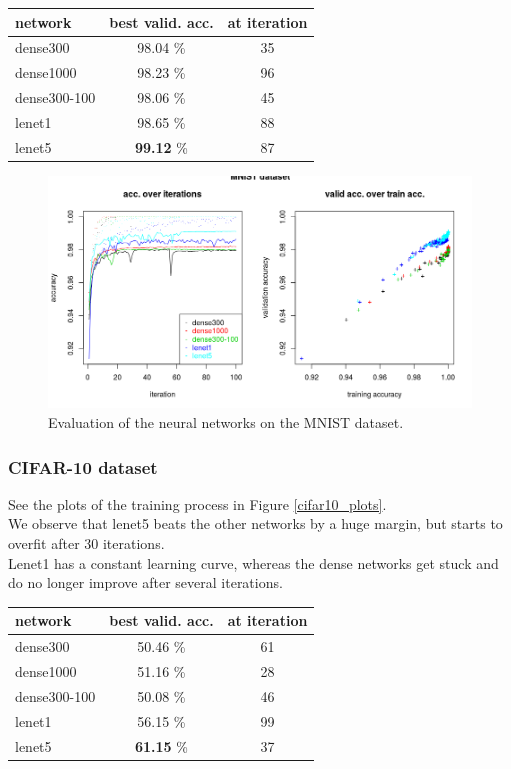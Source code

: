 \begin{tabular}{|l|c|c|}
 \hline
 network & best valid. acc. & at iteration\\ \hline
 dense300 & 98.04 \% & 35\\
 dense1000 & 98.23 \% & 96\\
 dense300-100 & 98.06 \% & 45\\
 lenet1 & 98.65 \% & 88\\
 lenet5 & \textbf{99.12} \% & 87\\
 \hline
\end{tabular}

\begin{figure}
 \includegraphics[width=\textwidth]{../plots/nn_mnist}
 \caption{Evaluation of the neural networks on the MNIST dataset.}
 \label{mnist_plots}
\end{figure}


\subsubsection{CIFAR-10 dataset}

See the plots of the training process in Figure \ref{cifar10_plots}.\\
We observe that lenet5 beats the other networks by a huge margin,
but starts to overfit after 30 iterations.\\
Lenet1 has a constant learning curve, whereas the dense networks
get stuck and do no longer improve after several iterations.

\begin{tabular}{|l|c|c|}
 \hline
 network & best valid. acc. & at iteration\\ \hline
 dense300 & 50.46 \% & 61\\
 dense1000 & 51.16 \% & 28\\
 dense300-100 & 50.08 \% & 46\\
 lenet1 & 56.15 \% & 99\\
 lenet5 & \textbf{61.15} \% & 37\\
 \hline
\end{tabular}\\

